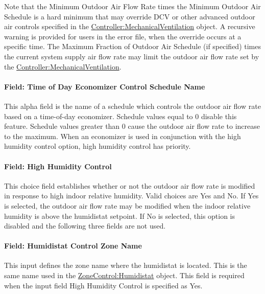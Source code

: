 Note that the Minimum Outdoor Air Flow Rate times the Minimum Outdoor Air Schedule is a hard minimum that may override DCV or other advanced outdoor air controls specified in the \hyperref[controllermechanicalventilation]{Controller:MechanicalVentilation} object.  A recursive warning is provided for users in the error file, when the override occurs at a specific time. The Maximum Fraction of Outdoor Air Schedule (if specified) times the current system supply air flow rate may limit the outdoor air flow rate set by the \hyperref[controllermechanicalventilation]{Controller:MechanicalVentilation}.

\paragraph{Field: Time of Day Economizer Control Schedule Name}\label{field-time-of-day-economizer-control-schedule-name}

This alpha field is the name of a schedule which controls the outdoor air flow rate based on a time-of-day economizer. Schedule values equal to 0 disable this feature. Schedule values greater than 0 cause the outdoor air flow rate to increase to the maximum. When an economizer is used in conjunction with the high humidity control option, high humidity control has priority.

\paragraph{Field: High Humidity Control}\label{field-high-humidity-control}

This choice field establishes whether or not the outdoor air flow rate is modified in response to high indoor relative humidity. Valid choices are Yes and No. If Yes is selected, the outdoor air flow rate may be modified when the indoor relative humidity is above the humidistat setpoint. If No is selected, this option is disabled and the following three fields are not used.

\paragraph{Field: Humidistat Control Zone Name}\label{field-humidistat-control-zone-name}

This input defines the zone name where the humidistat is located. This is the same name used in the \hyperref[zonecontrolhumidistat]{ZoneControl:Humidistat} object. This field is required when the input field High Humidity Control is specified as Yes.

